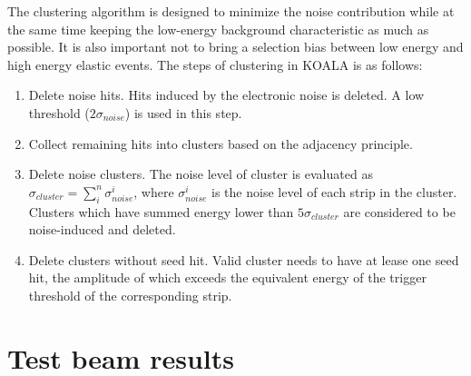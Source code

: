 \documentclass[number,5p]{elsarticle}
\begin{document}
The clustering algorithm is designed to minimize the noise contribution while
at the same time keeping the low-energy background characteristic as much as possible.
It is also important not to bring a selection bias between low energy and high energy elastic events.
The steps of clustering in KOALA is as follows:
\begin{enumerate}[Setp 1.]
\item Delete noise hits. Hits induced by the electronic noise is deleted. A low
  threshold ($2\sigma_{noise}$) is used in this step.
  \item Collect remaining hits into clusters based on the adjacency principle.
  \item Delete noise clusters. The noise level of cluster is evaluated as
    $\sigma_{cluster} = \sum_i^n{\sigma_{noise}^i}$, where $\sigma_{noise}^i$ is
    the noise level of each strip in the cluster. Clusters which have summed
    energy lower than $5\sigma_{cluster}$ are considered to be noise-induced and deleted.
  \item Delete clusters without seed hit. Valid cluster needs to have at lease one seed hit, the
    amplitude of which exceeds the equivalent energy of the trigger threshold of
    the corresponding strip.
\end{enumerate}

\section{Test beam results}
\label{sec:result}
\end{document}
